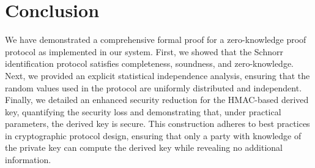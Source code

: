 \documentclass{article}
\begin{document}
\section{Conclusion}
We have demonstrated a comprehensive formal proof for a zero-knowledge proof protocol as implemented in our system. First, we showed that the Schnorr identification protocol satisfies completeness, soundness, and zero-knowledge. Next, we provided an explicit statistical independence analysis, ensuring that the random values used in the protocol are uniformly distributed and independent. Finally, we detailed an enhanced security reduction for the HMAC-based derived key, quantifying the security loss and demonstrating that, under practical parameters, the derived key is secure. This construction adheres to best practices in cryptographic protocol design, ensuring that only a party with knowledge of the private key can compute the derived key while revealing no additional information.
\end{document}
